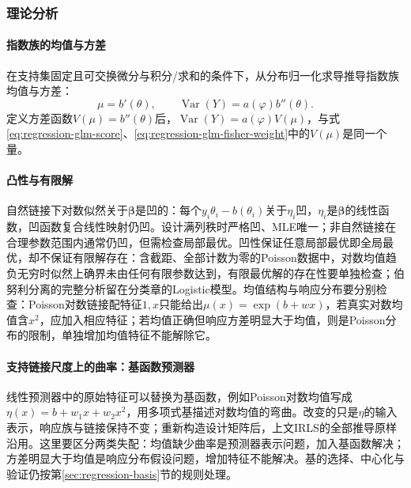 \subsubsection{理论分析}
\label{sec:regression-glm-theory}

\paragraph{指数族的均值与方差}

在支持集固定且可交换微分与积分/求和的条件下，从分布归一化求导推导指数族均值与方差：
\begin{equation}
  \mu=b'(\theta),\qquad \operatorname{Var}(Y)=a(\varphi)b''(\theta).
  \label{eq:regression-glm-moments}
\end{equation}
定义方差函数$V(\mu)=b''(\theta)$后，$\operatorname{Var}(Y)=a(\varphi)V(\mu)$，与式\eqref{eq:regression-glm-score}、\eqref{eq:regression-glm-fisher-weight}中的$V(\mu)$是同一个量。

\paragraph{凸性与有限解}

自然链接下对数似然关于$\bm{\beta}$是凹的：每个$y_i\theta_i-b(\theta_i)$关于$\eta_i$凹，$\eta_i$是$\bm{\beta}$的线性函数，凹函数复合线性映射仍凹。设计满列秩时严格凹、MLE唯一；非自然链接在合理参数范围内通常仍凹，但需检查局部最优。凹性保证任意局部最优即全局最优，却不保证有限解存在：含截距、全部计数为零的Poisson数据中，对数均值趋负无穷时似然上确界未由任何有限参数达到，有限最优解的存在性要单独检查；伯努利分离的完整分析留在分类章的Logistic模型。均值结构与响应分布要分别检查：Poisson对数链接配特征$1,x$只能给出$\mu(x)=\exp(b+wx)$，若真实对数均值含$x^2$，应加入相应特征；若均值正确但响应方差明显大于均值，则是Poisson分布的限制，单独增加均值特征不能解除它。

\paragraph{支持链接尺度上的曲率：基函数预测器}
\label{sec:regression-glm-basis}

线性预测器中的原始特征可以替换为基函数，例如Poisson对数均值写成$\eta(x)=b+w_1x+w_2x^2$，用多项式基描述对数均值的弯曲。改变的只是$\eta$的输入表示，响应族与链接保持不变；重新构造设计矩阵后，上文IRLS的全部推导原样沿用。这里要区分两类失配：均值缺少曲率是预测器表示问题，加入基函数解决；方差明显大于均值是响应分布假设问题，增加特征不能解决。基的选择、中心化与验证仍按第\ref{sec:regression-basis}节的规则处理。

